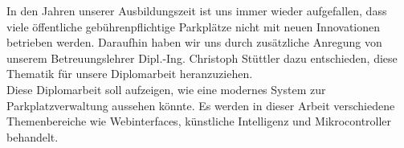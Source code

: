 In den Jahren unserer Ausbildungszeit ist uns immer wieder aufgefallen, dass
viele öffentliche gebührenpflichtige Parkplätze nicht mit neuen Innovationen
betrieben werden. Daraufhin haben wir uns durch zusätzliche Anregung von unserem
Betreuungslehrer Dipl.-Ing. Christoph Stüttler dazu entschieden, diese Thematik
für unsere Diplomarbeit heranzuziehen.\\

Diese Diplomarbeit soll aufzeigen, wie eine modernes System zur
Parkplatzverwaltung aussehen könnte. Es werden in dieser Arbeit verschiedene
Themenbereiche wie Webinterfaces, künstliche Intelligenz und Mikrocontroller
behandelt.